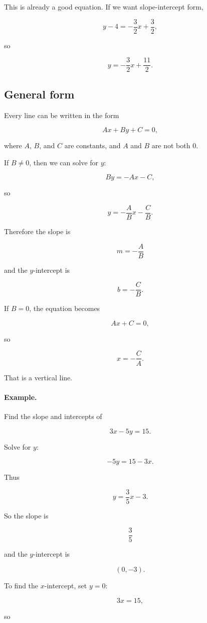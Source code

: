 This is already a good equation.  If we want slope-intercept form,

\[
y-4=-\frac32x+\frac32,
\]

so

\[
\boxed{
y=-\frac32x+\frac{11}{2}.
}
\]

\subsection{General form}
\label{appsubsec:general-form-lines}

Every line can be written in the form

\[
\boxed{
Ax+By+C=0,
}
\]

where \(A\), \(B\), and \(C\) are constants, and \(A\) and \(B\) are not both \(0\).

If \(B\neq0\), then we can solve for \(y\):

\[
By=-Ax-C,
\]

so

\[
y=-\frac ABx-\frac CB.
\]

Therefore the slope is

\[
\boxed{
m=-\frac AB
}
\]

and the \(y\)-intercept is

\[
\boxed{
b=-\frac CB.
}
\]

If \(B=0\), the equation becomes

\[
Ax+C=0,
\]

so

\[
x=-\frac CA.
\]

That is a vertical line.

\paragraph{Example.}
Find the slope and intercepts of

\[
3x-5y=15.
\]

Solve for \(y\):

\[
-5y=15-3x.
\]

Thus

\[
y=\frac35x-3.
\]

So the slope is

\[
\boxed{\frac35}
\]

and the \(y\)-intercept is

\[
\boxed{(0,-3)}.
\]

To find the \(x\)-intercept, set \(y=0\):

\[
3x=15,
\]

so

